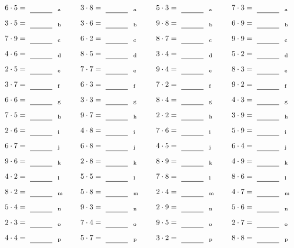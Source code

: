 \documentclass
[
  draft    = true,
  fontsize = 11pt,
  parskip  = half-
]
{scrartcl}
\begin{document}
\par\vfill\par
\begin{align*}
    \pline{6\cdot5}&=\rline{a}
  & \pline{3\cdot8}&=\rline{a}
  & \pline{5\cdot3}&=\rline{a}
  & \pline{7\cdot3}&=\rline{a} \\[1ex]
    \pline{3\cdot5}&=\rline{b}
  & \pline{3\cdot6}&=\rline{b}
  & \pline{9\cdot8}&=\rline{b}
  & \pline{6\cdot9}&=\rline{b} \\[1ex]
    \pline{7\cdot9}&=\rline{c}
  & \pline{6\cdot2}&=\rline{c}
  & \pline{8\cdot7}&=\rline{c}
  & \pline{9\cdot9}&=\rline{c} \\[1ex]
    \pline{4\cdot6}&=\rline{d}
  & \pline{8\cdot5}&=\rline{d}
  & \pline{3\cdot4}&=\rline{d}
  & \pline{5\cdot2}&=\rline{d} \\[1ex]
    \pline{2\cdot5}&=\rline{e}
  & \pline{7\cdot7}&=\rline{e}
  & \pline{9\cdot4}&=\rline{e}
  & \pline{8\cdot3}&=\rline{e} \\[1ex]
    \pline{3\cdot7}&=\rline{f}
  & \pline{6\cdot3}&=\rline{f}
  & \pline{7\cdot2}&=\rline{f}
  & \pline{9\cdot2}&=\rline{f} \\[1ex]
    \pline{6\cdot6}&=\rline{g}
  & \pline{3\cdot3}&=\rline{g}
  & \pline{8\cdot4}&=\rline{g}
  & \pline{4\cdot3}&=\rline{g} \\[1ex]
    \pline{7\cdot5}&=\rline{h}
  & \pline{9\cdot7}&=\rline{h}
  & \pline{2\cdot2}&=\rline{h}
  & \pline{3\cdot9}&=\rline{h} \\[1ex]
    \pline{2\cdot6}&=\rline{i}
  & \pline{4\cdot8}&=\rline{i}
  & \pline{7\cdot6}&=\rline{i}
  & \pline{5\cdot9}&=\rline{i} \\[1ex]
    \pline{6\cdot7}&=\rline{j}
  & \pline{6\cdot8}&=\rline{j}
  & \pline{4\cdot5}&=\rline{j}
  & \pline{6\cdot4}&=\rline{j} \\[1ex]
    \pline{9\cdot6}&=\rline{k}
  & \pline{2\cdot8}&=\rline{k}
  & \pline{8\cdot9}&=\rline{k}
  & \pline{4\cdot9}&=\rline{k} \\[1ex]
    \pline{4\cdot2}&=\rline{l}
  & \pline{5\cdot5}&=\rline{l}
  & \pline{7\cdot8}&=\rline{l}
  & \pline{8\cdot6}&=\rline{l} \\[1ex]
    \pline{8\cdot2}&=\rline{m}
  & \pline{5\cdot8}&=\rline{m}
  & \pline{2\cdot4}&=\rline{m}
  & \pline{4\cdot7}&=\rline{m} \\[1ex]
    \pline{5\cdot4}&=\rline{n}
  & \pline{9\cdot3}&=\rline{n}
  & \pline{2\cdot9}&=\rline{n}
  & \pline{5\cdot6}&=\rline{n} \\[1ex]
    \pline{2\cdot3}&=\rline{o}
  & \pline{7\cdot4}&=\rline{o}
  & \pline{9\cdot5}&=\rline{o}
  & \pline{2\cdot7}&=\rline{o} \\[1ex]
    \pline{4\cdot4}&=\rline{p}
  & \pline{5\cdot7}&=\rline{p}
  & \pline{3\cdot2}&=\rline{p}
  & \pline{8\cdot8}&=\rline{p}
\end{align*}
\end{document}
